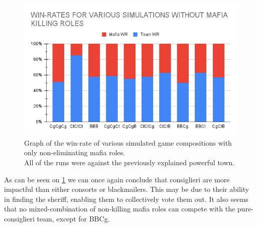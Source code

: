 \begin{figure}[H]
    \includegraphics[width=1\linewidth]{figures/Winrates_NonKilling}
    \caption{Graph of the win-rate of various 
    simulated game compositions with only 
    non-eliminating mafia roles.\\
        All of the runs were against the previously explained powerful town.}
    \label{fig:VariousSimulationsNonKilling}
\end{figure}
\vspace{-5px} As can be seen on \cref{fig:VariousSimulationsNonKilling} we can once again conclude that
consiglieri are more impactful than either consorts or blackmailers. This may
be due to their ability in finding the sheriff, enabling them to
collectively vote them out. It also seems that no mixed-combination of
non-killing mafia roles can compete with the pure-consiglieri team, except for BBCg.
